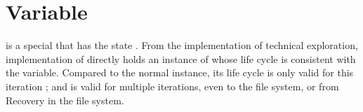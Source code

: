 \begin{savequote}[45mm]
\end{savequote}


\chapter{Variable}
\label{ch:variable}
\begin{content}
 is a special  that has the state . From the implementation of technical exploration,  implementation of  directly holds an instance of  whose life cycle is consistent with the variable. Compared to the normal  instance, its life cycle is only valid for this iteration ; and  is valid for multiple iterations, even to the file system, or from Recovery in the file system.
\end{content}


